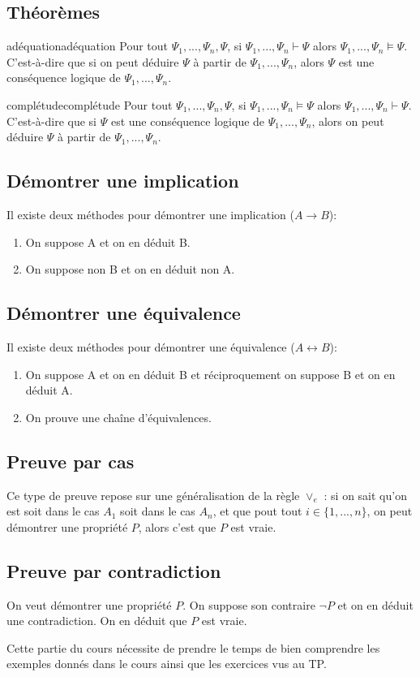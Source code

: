 \subsection{Théorèmes}
\begin{definition}{adéquation}{adéquation}
Pour tout $\Psi_1,...,\Psi_n,\Psi$, si $\Psi_1,...,\Psi_n\vdash\Psi$ alors $\Psi_1,...,\Psi_n\vDash\Psi$.
C'est-à-dire que si on peut déduire $\Psi$ à partir de $\Psi_1,...,\Psi_n$, alors $\Psi$ est une conséquence logique de $\Psi_1,...,\Psi_n$.
\end{definition}
\begin{definition}{complétude}{complétude}
Pour tout $\Psi_1,...,\Psi_n,\Psi$, si $\Psi_1,...,\Psi_n\vDash\Psi$ alors $\Psi_1,...,\Psi_n\vdash\Psi$.
C'est-à-dire que si $\Psi$ est une conséquence logique de $\Psi_1,...,\Psi_n$, alors on peut déduire $\Psi$ à partir de $\Psi_1,...,\Psi_n$.
\end{definition}

\subsection{Démontrer une implication}
Il existe deux méthodes pour démontrer une implication ($A\rightarrow B$):
\begin{enumerate}
    \item On suppose A et on en déduit B.
    \item On suppose non B et on en déduit non A.
\end{enumerate}

\subsection{Démontrer une équivalence}
Il existe deux méthodes pour démontrer une équivalence ($A\leftrightarrow B$):
\begin{enumerate}
    \item On suppose A et on en déduit B et réciproquement on suppose B et on en déduit A.
    \item On prouve une chaîne d'équivalences.
\end{enumerate}

\subsection{Preuve par cas}
Ce type de preuve repose sur une généralisation de la règle $\lor_e$ : si on sait qu'on est soit dans le cas $A_1$ soit dans le cas $A_n$, et que pout tout $i\in\{1,...,n\}$, on peut démontrer une propriété $P$, alors c'est que $P$ est vraie.

\subsection{Preuve par contradiction}
On veut démontrer une propriété $P$. On suppose son contraire $\neg P$ et on en déduit une contradiction. On en déduit que $P$ est vraie.

\begin{remark}
Cette partie du cours nécessite de prendre le temps de bien comprendre les exemples donnés dans le cours ainsi que les exercices vus au TP.
\end{remark}

